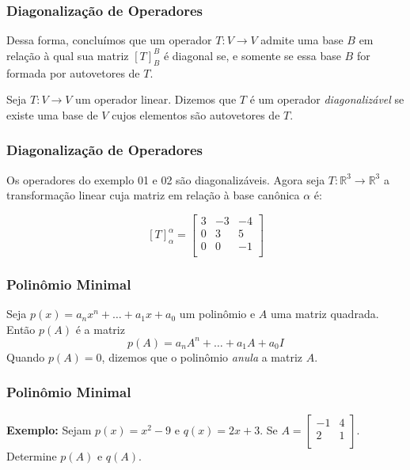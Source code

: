 \documentclass[hyperref={pdfpagelabels=false}]{beamer}
\begin{document}
\begin{frame}
\frametitle{Diagonalização de Operadores}

Dessa forma, concluímos que um operador $T:V \rightarrow V$ admite uma base $B$ em relação à qual sua matriz $[T]_{B}^{B}$ é diagonal se, e somente se essa base $B$ for formada por autovetores de $T$.

\pause

\begin{definition}
	Seja $T:V \rightarrow V$ um operador linear. Dizemos que $T$ é um operador \emph{diagonalizável} se existe uma base de $V$ cujos elementos são autovetores de $T$.
\end{definition}

\end{frame}
\begin{frame}
\frametitle{Diagonalização de Operadores}

Os operadores do exemplo 01 e 02 são diagonalizáveis. Agora seja $T: \mathbb{R}^3 \rightarrow \mathbb{R}^3$ a transformação linear cuja matriz em relação à base canônica $\alpha$ é:

$$[T]^{\alpha}_{\alpha} = \left[
\begin{array}{ccc}
3	&	-3	&	-4\\
0	&	3	&	5 \\
0	&	0	&	-1	\\
\end{array}
\right]$$


\end{frame}
\begin{frame}
\frametitle{Polinômio Minimal}

\begin{definition}
	Seja $p(x) = a_n x^n + \dots + a_1 x + a_0$ um polinômio e $A$ uma matriz quadrada. Então $p(A)$ é a matriz
	$$p(A) = a_n A^n + \dots + a_1 A + a_0 I$$
	Quando $p(A) = 0$, dizemos que o polinômio \emph{anula} a matriz $A$.
\end{definition}

\end{frame}
\begin{frame}
\frametitle{Polinômio Minimal}

{\bf Exemplo:} Sejam $p(x) = x^2 - 9$ e $q(x) = 2x + 3$. Se $A = \left[
\begin{array}{cc}
-1	&	4 \\
2	&	1 \\
\end{array}
\right]$. Determine $p(A)$ e $q(A)$.

\end{frame}
\end{document}
